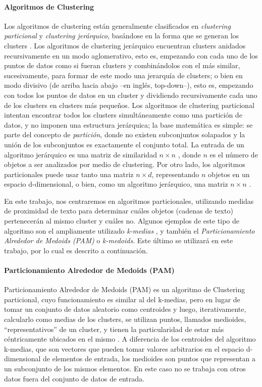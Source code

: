 \paragraph{Algoritmos de Clustering}\label{sec:algoritmos_clustering}
Los algoritmos de clustering están generalmente clasificados en \textit{clustering particional} y \textit{clustering jerárquico}, basándose en la forma que se generan los clusters \citep{xu2008clustering}. Los algoritmos de clustering jerárquico encuentran clusters anidados recursivamente en un modo aglomerativo, esto es, empezando con cada uno de los puntos de datos como si fueran clusters y combinándolos con el más similar, sucesivamente, para formar de este modo una jerarquía de clusters; o bien en modo divisivo (de arriba hacia abajo --en inglés, top-down--), esto es, empezando con todos los puntos de datos en un cluster y dividiendo recursivamente cada uno de los clusters en clusters más pequeños. Los algoritmos de clustering particional intentan encontrar todos los clusters simultáneamente como una partición de datos, y no imponen una estructura jerárquica; la base matemática es simple: se parte del concepto de \textit{partición}, donde no existen subconjuntos solapados y la unión de los subconjuntos es exactamente el conjunto total. La entrada de un algoritmo jerárquico es una matriz de similaridad \(n \times n\) , donde \(n\) es el número de objetos a ser analizados por medio de clustering. Por otro lado, los algoritmos particionales puede usar tanto una matriz \(n \times d\), representando \(n\) objetos en un espacio d-dimensional, o bien, como un algoritmo jerárquico, una matriz \(n \times n\) \citep{jain2010data}.

\bigskip En este trabajo, nos centraremos en algoritmos particionales, utilizando medidas de proximidad de texto para determinar cuáles objetos (cadenas de texto) pertenecerán al mismo cluster y cuáles no. Algunos ejemplos de este tipo de algoritmo son el ampliamente utilizado \textit{k-medias} \citep{macqueen1967some}, y también el \textit{Particionamiento Alrededor de Medoids (PAM)} o \textit{k-medoids}. Este último se utilizará en este trabajo, por lo cual es descrito a continuación.

\paragraph{Particionamiento Alrededor de Medoids (PAM)}
Particionamiento Alrededor de Medoids (PAM) es un algoritmo de Clustering particional, cuyo funcionamiento es similar al del k-medias, pero en lugar de tomar un conjunto de datos aleatorio como centroides y luego, iterativamente, calcularlo como medias de los clusters, se utilizan puntos, llamados medioides, “representativos” de un cluster, y tienen la particularidad de estar más céntricamente ubicados en el mismo \citep{rdusseeun1987clustering}. A diferencia de los centroides del algoritmo k-medias, que son vectores que pueden tomar valores arbitrarios en el espacio d-dimensional de elementos de entrada, los medioides son puntos que representan a un subconjunto de los mismos elementos. En este caso no se trabaja con otros datos fuera del conjunto de datos de entrada.

